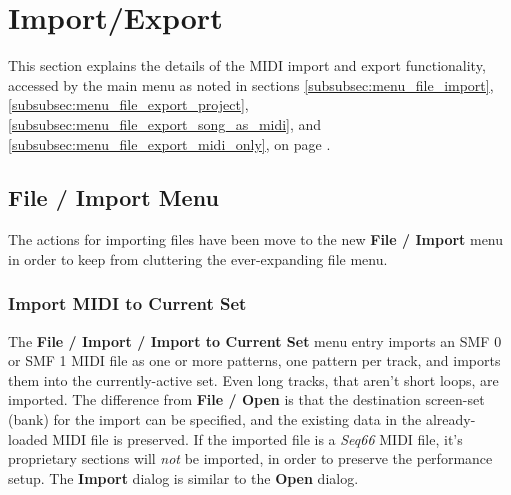 %
%
%

\section{Import/Export}
\label{sec:midi_export}

   This section explains the details of the MIDI import and export
   functionality, accessed by the main menu as noted in sections
   \ref{subsubsec:menu_file_import},
   \ref{subsubsec:menu_file_export_project},
   \ref{subsubsec:menu_file_export_song_as_midi}, and
   \ref{subsubsec:menu_file_export_midi_only}, on page
   \pageref{subsubsec:menu_file_import}.

\subsection{File / Import Menu}
\label{subsec:midi_export_file_import_menu}

   The actions for importing files have been move to the new
   \textbf{File / Import} menu in order to keep from cluttering the
   ever-expanding file menu.

\subsubsection{Import MIDI to Current Set}
\label{subsubsec:midi_export_file_import}

   The \textbf{File / Import / Import to Current Set} menu entry imports an SMF 0
   or SMF 1 MIDI file as one or more patterns, one pattern per track, and
   imports them into the currently-active set.
   Even long tracks, that aren't short loops, are imported.
   The difference from \textbf{File / Open} is that the destination screen-set
   (bank) for the import can be specified, and the existing data in the
   already-loaded MIDI file is preserved.
   If the imported file is a
   \textsl{Seq66} MIDI file, it's proprietary sections will
   \textsl{not} be imported, in order to preserve the performance setup.
   The \textbf{Import} dialog is similar to the \textbf{Open} dialog.

